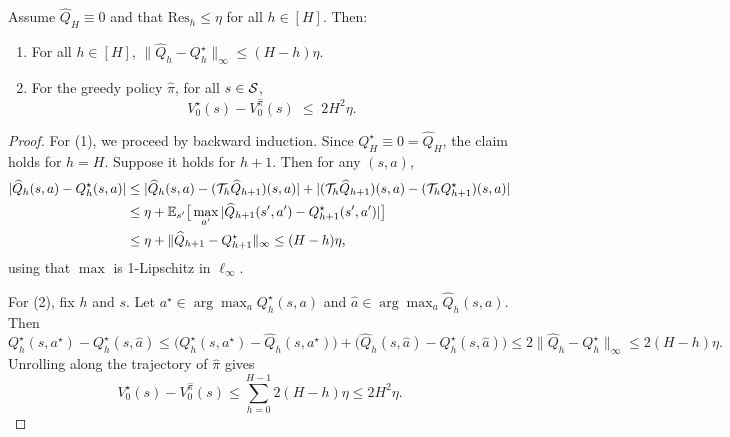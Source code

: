 \begin{lemma}
\label{lem:residual_to_policy}
Assume $\widehat Q_H\equiv 0$ and that $\mathrm{Res}_h \le \eta$ for all $h\in[H]$.
Then:
\begin{enumerate}
\item For all $h\in[H]$, $\|\widehat Q_h - Q_h^\star\|_\infty \le (H-h)\eta$.
\item For the greedy policy $\widehat\pi$, for all $s\in\mathcal{S}$,
\[
V_0^\star(s) - V^{\widehat\pi}_0(s) \;\le\; 2H^2\eta.
\]
\end{enumerate}
\end{lemma}

\begin{proof}
For (1), we proceed by backward induction. Since $Q_H^\star\equiv 0=\widehat Q_H$,
the claim holds for $h=H$. Suppose it holds for $h+1$. Then for any $(s,a)$,
\begin{align*}
|\widehat Q_h(s,a) - Q_h^\star(s,a)|
&\le |\widehat Q_h(s,a) - (\mathcal{T}_h\widehat Q_{h+1})(s,a)|
     + |(\mathcal{T}_h\widehat Q_{h+1})(s,a) - (\mathcal{T}_h Q_{h+1}^\star)(s,a)| \\
&\le \eta + \mathbb{E}_{s'}\big[\max_{a'}|\widehat Q_{h+1}(s',a')-Q_{h+1}^\star(s',a')|\big] \\
&\le \eta + \|\widehat Q_{h+1}-Q_{h+1}^\star\|_\infty
\le (H-h)\eta,
\end{align*}
using that $\max$ is 1-Lipschitz in $\ell_\infty$.

For (2), fix $h$ and $s$. Let $a^\star\in\arg\max_a Q_h^\star(s,a)$ and
$\widehat a\in\arg\max_a \widehat Q_h(s,a)$. Then
\[
Q_h^\star(s,a^\star) - Q_h^\star(s,\widehat a)
\le
\bigl(Q_h^\star(s,a^\star)-\widehat Q_h(s,a^\star)\bigr)
+
\bigl(\widehat Q_h(s,\widehat a)-Q_h^\star(s,\widehat a)\bigr)
\le 2\|\widehat Q_h-Q_h^\star\|_\infty
\le 2(H-h)\eta.
\]
Unrolling along the trajectory of $\widehat\pi$ gives
\[
V_0^\star(s) - V_0^{\widehat\pi}(s)
\le \sum_{h=0}^{H-1} 2(H-h)\eta
\le 2H^2\eta.
\]
\end{proof}

